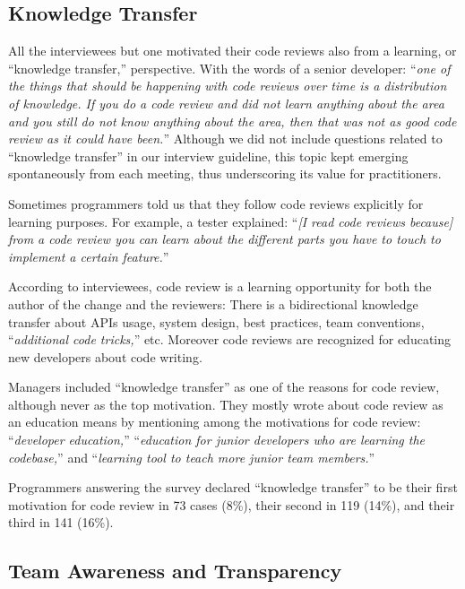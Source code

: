 \documentclass[conference]{IEEEtran}
\renewcommand{\quotation}[1]{``\emph{#1}''}
\begin{document}
\subsection{Knowledge Transfer}

All the interviewees but one motivated their code reviews also from a learning,
or ``knowledge transfer,'' perspective. With the words of a senior developer:
\quotation{one of the things that should be happening with code reviews over
time is a distribution of knowledge. If you do a code review and did not learn
anything about the area and you still do not know anything about the area, then
that was not as good code review as it could have been.} Although we did not
include questions related to ``knowledge transfer'' in our interview guideline,
this topic kept emerging spontaneously from each meeting, thus underscoring its
value for practitioners.

Sometimes programmers told us that they follow code reviews explicitly for
learning purposes. For example, a tester explained: \quotation{[I read code
reviews because] from a code review you can learn about the different parts you
have to touch to implement a certain feature.}

According to interviewees, code review is a learning opportunity for both the
author of the change and the reviewers: There is a bidirectional knowledge
transfer about APIs usage, system design, best practices, team conventions,
\quotation{additional code tricks,} etc. Moreover code reviews are recognized
for educating new developers about code writing.

Managers included ``knowledge transfer'' as one of the reasons for code review,
although never as the top motivation. They mostly wrote about code review as an
education means by mentioning among the motivations for code review:
\quotation{developer education,} \quotation{education for junior developers who
are learning the codebase,} and \quotation{learning tool to teach more junior
team members.}

Programmers answering the survey declared ``knowledge transfer'' to be their
first motivation for code review in 73 cases (8\%), their second in 119 (14\%),
and their third in 141 (16\%).

\subsection{Team Awareness and Transparency}
\end{document}
